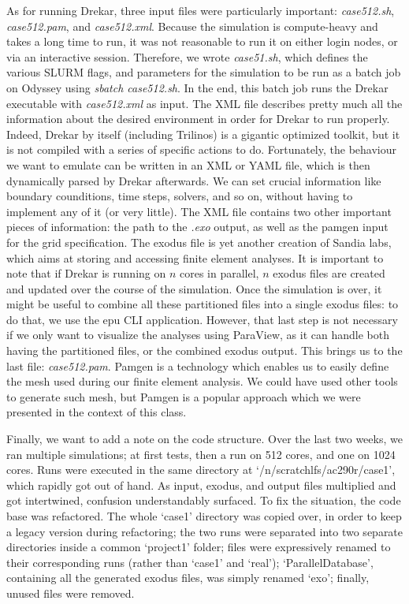 \documentclass[11pt]{article} %
\begin{document}
As for running Drekar, three input files were particularly important: \textit{case512.sh}, \textit{case512.pam}, and \textit{case512.xml}. 
Because the simulation is compute-heavy and takes a long time to run, it was not reasonable to run it on 
either login nodes, or via an interactive session. 
Therefore, we wrote \textit{case51.sh}, which defines the various SLURM flags, and parameters for the simulation
to be run as a batch job on Odyssey using \textit{sbatch case512.sh}. 
In the end, this batch job runs the Drekar executable with \textit{case512.xml} as input. 
The XML file describes pretty much all the information about the desired environment in order for Drekar to run properly. 
Indeed, Drekar by itself (including Trilinos) is a gigantic optimized toolkit, but it is not compiled with a series of specific actions to do. 
Fortunately, the behaviour we want to emulate can be written in an XML or YAML file, which is then dynamically parsed by Drekar afterwards. 
We can set crucial information like boundary counditions, time steps, solvers, and so on, without having to implement any of it (or very little). 
The XML file contains two other important pieces of information: the path to the \textit{.exo} output, 
as well as the pamgen input for the grid specification. 
The exodus file is yet another creation of Sandia labs, which aims at storing and accessing finite element analyses.\cite{exo} 
It is important to note that if Drekar is running on $n$ cores in parallel, $n$ exodus files are created 
and updated over the course of the simulation. 
Once the simulation is over, it might be useful to combine all these partitioned files into a single exodus files: 
to do that, we use the epu CLI application. However, that last step is not necessary if we only want to visualize
 the analyses using ParaView, as it can handle both having the partitioned files, or the combined exodus output.  
This brings us to the last file: \textit{case512.pam}.  
Pamgen is a technology which enables us to easily define the mesh used during our finite element analysis.\cite{pam} 
We could have used other tools to generate such mesh, but Pamgen is a popular approach which we were presented in the context of this class.

Finally, we want to add a note on the code structure. Over the last two weeks, we ran multiple simulations; at first tests, then a run on 512 cores, and one on 1024 cores. Runs were executed in the same directory at `/n/scratchlfs/ac290r/case1', which rapidly got out of hand. As input, exodus, and output files multiplied and got intertwined, confusion understandably surfaced. To fix the situation, the code base was refactored. The whole `case1' directory was copied over, in order to keep a legacy version during refactoring; the two runs were separated into two separate directories inside a common `project1' folder; files were expressively renamed to their corresponding runs (rather than `case1' and `real'); `ParallelDatabase', containing all the generated exodus files, was simply renamed `exo'; finally, unused files were removed.
\end{document}
